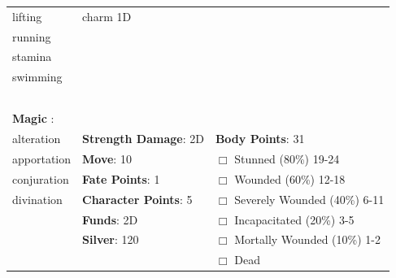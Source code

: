 \documentclass[10pt]{article}
\begin{document}
\begin{table}
\begin{tabular}{m{156pt} m{156pt} m{156pt}}
lifting              \hrulefill & charm             1D \hrulefill &  \hrulefill \\

running              \hrulefill &  \hrulefill &  \hrulefill \\

stamina              \hrulefill &  \hrulefill &  \hrulefill \\

swimming             \hrulefill &  \hrulefill &  \hrulefill \\

 \hrulefill &  \hrulefill &  \hrulefill \\

 \hrulefill &  \hrulefill &  \hrulefill \\

 \hrulefill &  \hrulefill &  \hrulefill \\

 \hrulefill &  \hrulefill &  \hrulefill \\

                                  &                                 &                             \\
\textbf{Magic }:  \hrulefill  &                                 &                             \\
alteration           \hrulefill & \textbf{Strength Damage}: 2D \hrulefill                             & \textbf{Body Points}: 31 \hrulefill \\
apportation          \hrulefill                        & \textbf{Move}:             10             \hrulefill    & $\Box$ Stunned \footnotesize{(80\%)} \hfill 19-24 \\
conjuration          \hrulefill                        & \textbf{Fate Points}:      1      \hrulefill    & $\Box$ Wounded \footnotesize{(60\%)} \hfill 12-18 \\
divination           \hrulefill                        & \textbf{Character Points}: 5 \hrulefill    & $\Box$ Severely Wounded \footnotesize{(40\%)} \hfill 6-11 \\
 \hrulefill                        & \textbf{Funds}:            2D            \hrulefill    & $\Box$ Incapacitated \footnotesize{(20\%)} \hfill 3-5 \\
 \hrulefill                        & \textbf{Silver}:           120           \hrulefill    & $\Box$ Mortally Wounded \footnotesize{(10\%)} \hfill 1-2 \\
 \hrulefill                        &  \hrulefill                                                       & $\Box$ Dead   \\
\end{tabular}
\end{table}
\cleardoublepage
\end{document}
